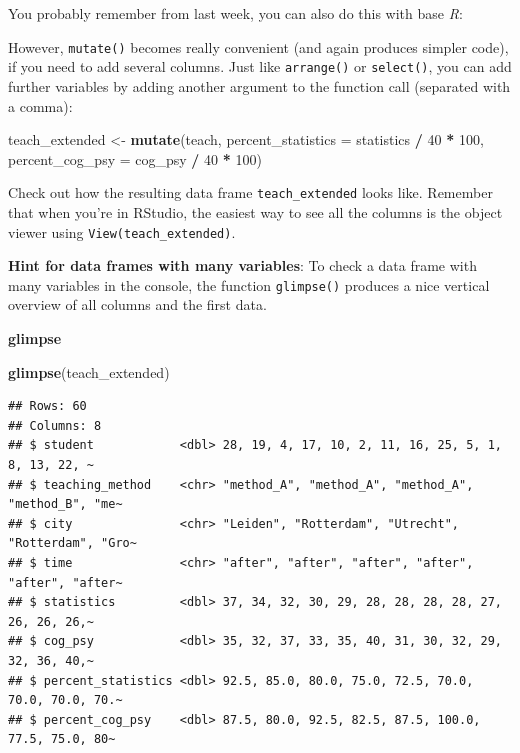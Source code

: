 \documentclass[
]{scrartcl}
\newenvironment{Shaded}{\begin{snugshade}}{\end{snugshade}}
\newcommand{\DataTypeTok}[1]{\textcolor[rgb]{0.13,0.29,0.53}{#1}}
\newcommand{\DecValTok}[1]{\textcolor[rgb]{0.00,0.00,0.81}{#1}}
\newcommand{\KeywordTok}[1]{\textcolor[rgb]{0.13,0.29,0.53}{\textbf{#1}}}
\newcommand{\NormalTok}[1]{#1}
\newcommand{\OperatorTok}[1]{\textcolor[rgb]{0.81,0.36,0.00}{\textbf{#1}}}
\newcommand{\StringTok}[1]{\textcolor[rgb]{0.31,0.60,0.02}{#1}}
\newenvironment{webexsolution}[1]
    {\par\tiny\textbf{#1}}
    {\par}
\newcommand{\webexhide}[1]{\begin{webexsolution}{#1}}
\begin{document}
You probably remember from last week, you can also do this with base \emph{R}:

\begin{Shaded}
\end{Shaded}

However, \texttt{mutate()} becomes really convenient (and again produces simpler code), if you need to add several columns. Just like \texttt{arrange()} or \texttt{select()}, you can add further variables by adding another argument to the function call (separated with a comma):

\begin{Shaded}
\begin{Highlighting}[]
\NormalTok{teach\_extended \textless{}{-}}\StringTok{ }\KeywordTok{mutate}\NormalTok{(teach,}
                    \DataTypeTok{percent\_statistics =}\NormalTok{ statistics }\OperatorTok{/}\StringTok{ }\DecValTok{40} \OperatorTok{*}\StringTok{ }\DecValTok{100}\NormalTok{,}
                    \DataTypeTok{percent\_cog\_psy =}\NormalTok{ cog\_psy }\OperatorTok{/}\StringTok{ }\DecValTok{40} \OperatorTok{*}\StringTok{ }\DecValTok{100}\NormalTok{)}
\end{Highlighting}
\end{Shaded}

Check out how the resulting data frame \texttt{teach\_extended} looks like. Remember that when you're in RStudio, the easiest way to see all the columns is the object viewer using \texttt{View(teach\_extended)}.

\textbf{Hint for data frames with many variables}: To check a data frame with many variables in the console, the function \texttt{glimpse()} produces a nice vertical overview of all columns and the first data.

\webexhide{glimpse}

\begin{Shaded}
\begin{Highlighting}[]
\KeywordTok{glimpse}\NormalTok{(teach\_extended)}
\end{Highlighting}
\end{Shaded}

\begin{verbatim}
## Rows: 60
## Columns: 8
## $ student            <dbl> 28, 19, 4, 17, 10, 2, 11, 16, 25, 5, 1, 8, 13, 22, ~
## $ teaching_method    <chr> "method_A", "method_A", "method_A", "method_B", "me~
## $ city               <chr> "Leiden", "Rotterdam", "Utrecht", "Rotterdam", "Gro~
## $ time               <chr> "after", "after", "after", "after", "after", "after~
## $ statistics         <dbl> 37, 34, 32, 30, 29, 28, 28, 28, 28, 27, 26, 26, 26,~
## $ cog_psy            <dbl> 35, 32, 37, 33, 35, 40, 31, 30, 32, 29, 32, 36, 40,~
## $ percent_statistics <dbl> 92.5, 85.0, 80.0, 75.0, 72.5, 70.0, 70.0, 70.0, 70.~
## $ percent_cog_psy    <dbl> 87.5, 80.0, 92.5, 82.5, 87.5, 100.0, 77.5, 75.0, 80~
\end{verbatim}
\end{document}
